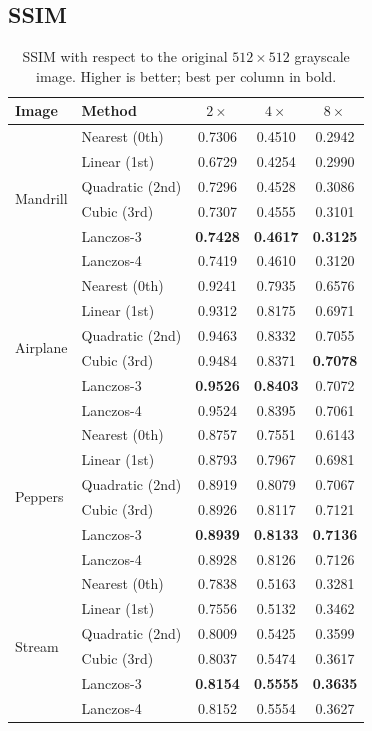 \documentclass[11pt,a4paper]{article}
\begin{document}
\subsection{SSIM}

\begin{table}[H]
\centering
\caption{SSIM with respect to the original $512\times512$ grayscale image. Higher is better;
best per column in bold.}
\label{tab:ssim}
\begin{tabular}{llccc}
\toprule
Image & Method & $2\times$ & $4\times$ & $8\times$ \\
\midrule
\multirow{6}{*}{Mandrill}
 & Nearest (0th)   & 0.7306 & 0.4510 & 0.2942 \\
 & Linear (1st)    & 0.6729 & 0.4254 & 0.2990 \\
 & Quadratic (2nd) & 0.7296 & 0.4528 & 0.3086 \\
 & Cubic (3rd)     & 0.7307 & 0.4555 & 0.3101 \\
 & Lanczos-3       & \textbf{0.7428} & \textbf{0.4617} & \textbf{0.3125} \\
 & Lanczos-4       & 0.7419 & 0.4610 & 0.3120 \\
\midrule
\multirow{6}{*}{Airplane}
 & Nearest (0th)   & 0.9241 & 0.7935 & 0.6576 \\
 & Linear (1st)    & 0.9312 & 0.8175 & 0.6971 \\
 & Quadratic (2nd) & 0.9463 & 0.8332 & 0.7055 \\
 & Cubic (3rd)     & 0.9484 & 0.8371 & \textbf{0.7078} \\
 & Lanczos-3       & \textbf{0.9526} & \textbf{0.8403} & 0.7072 \\
 & Lanczos-4       & 0.9524 & 0.8395 & 0.7061 \\
\midrule
\multirow{6}{*}{Peppers}
 & Nearest (0th)   & 0.8757 & 0.7551 & 0.6143 \\
 & Linear (1st)    & 0.8793 & 0.7967 & 0.6981 \\
 & Quadratic (2nd) & 0.8919 & 0.8079 & 0.7067 \\
 & Cubic (3rd)     & 0.8926 & 0.8117 & 0.7121 \\
 & Lanczos-3       & \textbf{0.8939} & \textbf{0.8133} & \textbf{0.7136} \\
 & Lanczos-4       & 0.8928 & 0.8126 & 0.7126 \\
\midrule
\multirow{6}{*}{Stream}
 & Nearest (0th)   & 0.7838 & 0.5163 & 0.3281 \\
 & Linear (1st)    & 0.7556 & 0.5132 & 0.3462 \\
 & Quadratic (2nd) & 0.8009 & 0.5425 & 0.3599 \\
 & Cubic (3rd)     & 0.8037 & 0.5474 & 0.3617 \\
 & Lanczos-3       & \textbf{0.8154} & \textbf{0.5555} & \textbf{0.3635} \\
 & Lanczos-4       & 0.8152 & 0.5554 & 0.3627 \\
\bottomrule
\end{tabular}
\end{table}
\end{document}
